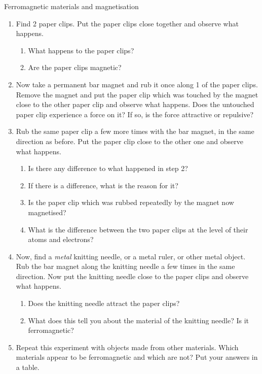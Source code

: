             \begin{Investigation}{Ferromagnetic materials and magnetisation}
            \nopagebreak
      \label{m37830*id128416}\begin{enumerate}[noitemsep, label=\textbf{\arabic*}. ] 
            \label{m37830*uid1}\item Find 2 paper clips. Put the paper clips close together and observe what happens.
\label{m37830*id128431}\begin{enumerate}[noitemsep, label=\textbf{\alph*}. ] 
            \label{m37830*uid2}\item What happens to the paper clips?\label{m37830*uid3}\item Are the paper clips magnetic?\end{enumerate}
        \label{m37830*uid4}\item Now take a permanent bar magnet and rub it once along 1 of the paper clips. Remove the magnet and put the paper clip which was touched by the magnet close to the other paper clip and observe what happens. Does the untouched paper clip experience a force on it? If so, is the force attractive or repulsive?\label{m37830*uid6}\item Rub the same paper clip a few more times with the bar magnet, in the same direction as before. Put the paper clip close to the other one and observe what happens.
\label{m37830*id128510}\begin{enumerate}[noitemsep, label=\textbf{\alph*}. ] 
            \label{m37830*uid7}\item Is there any difference to what happened in step 2?\label{m37830*uid8}\item If there is a difference, what is the reason for it?\label{m37830*uid9}\item Is the paper clip which was rubbed repeatedly by the magnet now magnetised?\label{m37830*uid10}\item What is the difference between the two paper clips at the level of their atoms and electrons?\end{enumerate}
        \label{m37830*uid11}\item Now, find a \textsl{metal} knitting needle, or a metal ruler, or other metal object. Rub the bar magnet along the knitting needle a few times in the same direction. Now put the knitting needle close to the paper clips and observe what happens.
\label{m37830*id128593}\begin{enumerate}[noitemsep, label=\textbf{\alph*}. ] 
            \label{m37830*uid12}\item Does the knitting needle attract the paper clips?\label{m37830*uid13}\item What does this tell you about the material of the knitting needle? Is it ferromagnetic?\end{enumerate}
        \label{m37830*uid14}\item Repeat this experiment with objects made from other materials. Which materials appear to be ferromagnetic and which are not? Put your answers in a table.\end{enumerate}
      \end{Investigation}
